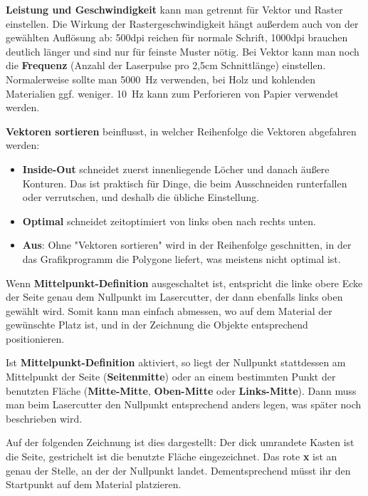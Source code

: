 \documentclass{\basedir/fablab-document}
\begin{document}
	\textbf{Leistung und Geschwindigkeit} kann man getrennt für Vektor und Raster einstellen. Die Wirkung der Rastergeschwindigkeit hängt außerdem auch von der gewählten Auflösung ab: 500dpi reichen für normale Schrift, 1000dpi brauchen deutlich länger und sind nur für feinste Muster nötig. Bei Vektor kann man noch die \textbf{Frequenz} (Anzahl der Laserpulse pro 2,5cm Schnittlänge) einstellen. Normalerweise sollte man 5000~Hz verwenden, bei Holz und kohlenden Materialien ggf. weniger. 10~Hz kann zum Perforieren von Papier verwendet werden. %
	
	\textbf{Vektoren sortieren} beinflusst, in welcher Reihenfolge die Vektoren abgefahren werden:
	\begin{itemize}
		\item \textbf{Inside-Out} schneidet zuerst innenliegende Löcher und danach äußere Konturen.  Das ist praktisch für Dinge, die beim Ausschneiden runterfallen oder verrutschen, und deshalb die übliche Einstellung.
		\item \textbf{Optimal} schneidet zeitoptimiert von links oben nach rechts unten.
		\item \textbf{Aus}: Ohne "Vektoren sortieren" wird in der Reihenfolge geschnitten, in der das Grafikprogramm die Polygone liefert, was meistens nicht optimal ist.
	\end{itemize}
	
	
	Wenn \textbf{Mittelpunkt-Definition} ausgeschaltet ist, entspricht die linke obere Ecke der Seite genau dem Nullpunkt im Lasercutter, der dann ebenfalls links oben gewählt wird. Somit kann man einfach abmessen, wo auf dem Material der gewünschte Platz ist, und in der Zeichnung die Objekte entsprechend positionieren.
	
	Ist \textbf{Mittelpunkt-Definition} aktiviert, so liegt der Nullpunkt stattdessen am Mittelpunkt der Seite (\textbf{Seiten\-mitte}) oder an einem bestimmten Punkt der benutzten Fläche (\textbf{Mitte-Mitte}, \textbf{Oben-Mitte} oder \textbf{Links-Mitte}). Dann muss man beim Lasercutter den Nullpunkt entsprechend anders legen, was später noch beschrieben wird.
	
	Auf der folgenden Zeichnung ist dies dargestellt: Der dick umrandete Kasten ist die Seite, gestrichelt ist die benutzte Fläche eingezeichnet. Das rote \textbf{x} ist an genau der Stelle, an der der Nullpunkt landet. Dementsprechend müsst ihr den Startpunkt auf dem Material platzieren.
	
\end{document}
